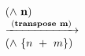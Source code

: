 \newcommand{\lam}[2]{\lambda#1.\,#2}

\begin{flushleft}

$\begin{array}{l}
  (\wedge~\mathbf{n})\\
  \xrightarrow{\hspace*{0.1cm}\mathbf{(transpose~m)}\hspace*{0.1cm}}\\
  (\wedge~\{n~+~m\})\\
\end{array}$

\end{flushleft}
